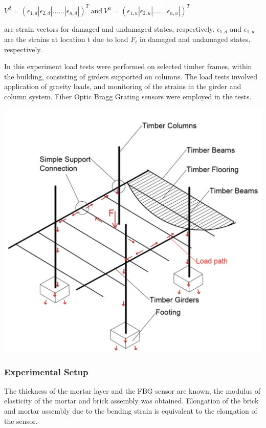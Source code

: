 \documentclass{article}
\begin{document}
\begin{center}
    $V^d =(\epsilon_{1,d}|\epsilon_{2,d}|......|\epsilon_{n,d}|)^T \ \text{and} \ V^u = (\epsilon_{1,u}|\epsilon_{2,u}|......|\epsilon_{n,u}|)^T $
\end{center}

are strain vectors for damaged and undamaged states, respectively. $\epsilon_{1,d}$ and $\epsilon_{1,u}$ are the strains at location t due to load $F_i$ in damaged and undamaged states, respectively.

In this experiment load tests were performed on selected timber frames, within the building, consisting of girders supported on columns. The load tests involved application of gravity loads, and monitoring of the strains in the girder and column system. Fiber Optic Bragg Grating sensors were employed in the tests.

\begin{center}
    \includegraphics[scale=0.23]{Images/Gravitation_loading.png}

\end{center}

\justifying
\subsubsection{Experimental Setup}
The thickness of the mortar layer and the FBG sensor are known, the modulus of elasticity of the mortar and brick assembly was obtained. Elongation of the brick and mortar assembly due to the bending strain is equivalent to the elongation of the sensor.
\end{document}
